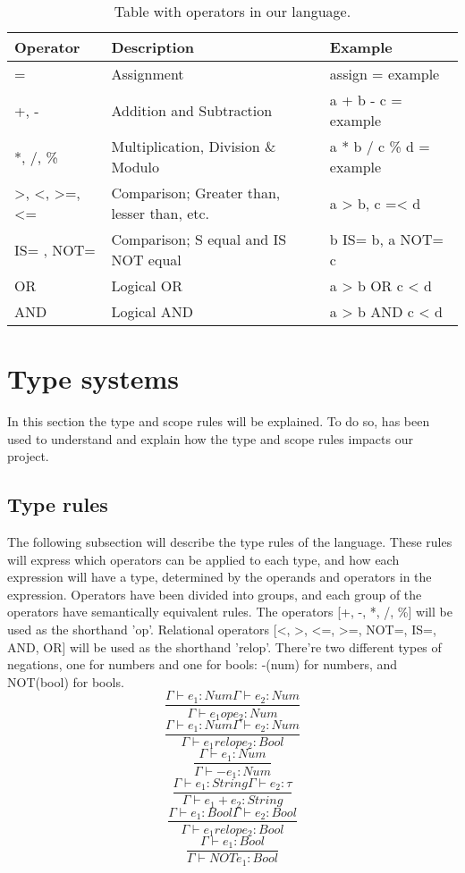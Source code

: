 \begin{table}[h]
	\centering
	\begin{tabular}{|l|l|l|}
		\hline
		Operator & Description & Example                \\ \hline
		=			& Assignment &  assign = example\\ \hline
		+, -		& Addition and Subtraction &  a + b - c = example \\ \hline
		*, /, \%		& Multiplication, Division \& Modulo &  a * b / c \% d = example\\ \hline
		>, <, >=, <= & Comparison; Greater than, lesser than, etc. & a > b, c =< d \\ \hline
		IS=	, NOT=	 &  Comparison; S equal and IS NOT equal & b IS= b, a NOT= c \\ \hline
		OR			& Logical OR & a > b OR c < d  \\ \hline
		AND		& Logical AND &	a > b AND c < d  \\ \hline
	\end{tabular}
	\caption{Table with operators in our language.}
	\label{fig:OperatorTable}
\end{table}

\section{Type systems}
In this section the type and scope rules will be explained. To do so, \citep{Sebesta} has been used to understand and explain how the type and scope rules impacts our project.

\subsection{Type rules}
The following subsection will describe the type rules of the language. These rules will express which operators can be applied to each type, and how each expression will have a type, determined by the operands and operators in the expression.
Operators have been divided into groups, and each group of the operators have semantically equivalent rules.
The operators [+, -, *, /, \%] will be used as the shorthand 'op'. Relational operators [<, >, <=, >=, NOT=, IS=, AND, OR] will be used as the shorthand 'relop'. There're two different types of negations, one for numbers and one for bools: -(num) for numbers, and NOT(bool) for bools.
\[
\dfrac{\Gamma \vdash e_1 : Num \Gamma \vdash e_2 : Num}{\Gamma \vdash e_1 op e_2 : Num}
\]
\[
\dfrac{\Gamma \vdash e_1 : Num \Gamma \vdash e_2 : Num}{\Gamma \vdash e_1 relop e_2 : Bool}
\]
\[
\dfrac{\Gamma \vdash e_1 : Num}{\Gamma \vdash -e_1 : Num}
\]
\[
\dfrac{\Gamma \vdash e_1 : String \Gamma \vdash e_2 : \tau}{\Gamma \vdash e_1 + e_2 : String}
\]
\[
\dfrac{\Gamma \vdash e_1 : Bool \Gamma \vdash e_2 : Bool}{\Gamma \vdash e_1 relop e_2 : Bool}
\]
\[
\dfrac{\Gamma \vdash e_1 : Bool}{\Gamma \vdash NOTe_1 : Bool}
\]
